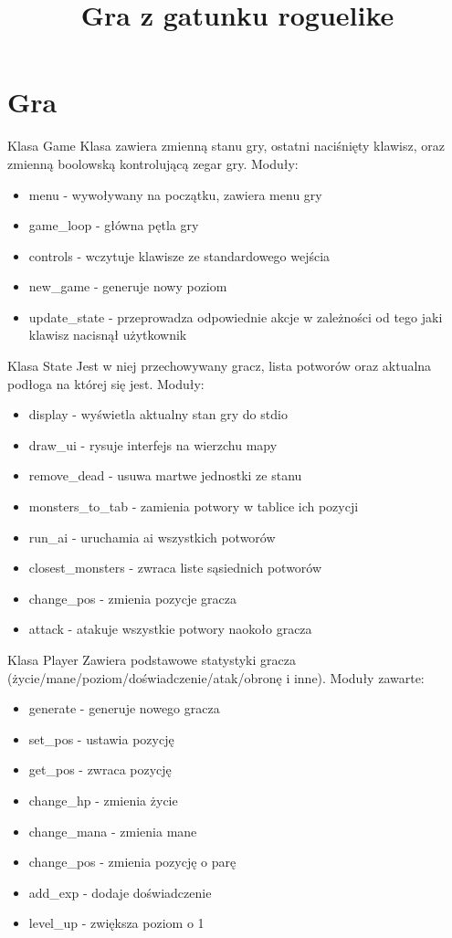 \documentclass{beamer}
\title[Programowanie Obiektowe]{Gra z gatunku roguelike}
\begin{document}
\begin{frame}
  \titlepage
\end{frame}
\section{Gra}
\begin{frame}{Klasa Game}
Klasa zawiera zmienną stanu gry, ostatni naciśnięty klawisz, oraz zmienną boolowską kontrolującą zegar gry. Moduły:
\begin{itemize}
\item menu - wywoływany na początku, zawiera menu gry
\item game\_loop - główna pętla gry
\item controls - wczytuje klawisze ze standardowego wejścia
\item new\_game - generuje nowy poziom
\item update\_state - przeprowadza odpowiednie akcje w zależności od tego jaki klawisz nacisnął użytkownik
\end{itemize}
\end{frame}
\begin{frame}{Klasa State}
Jest w niej przechowywany gracz, lista potworów oraz aktualna podłoga na której się jest. Moduły:
\begin{itemize}
\item display - wyświetla aktualny stan gry do stdio
\item draw\_ui - rysuje interfejs na wierzchu mapy
\item remove\_dead - usuwa martwe jednostki ze stanu
\item monsters\_to\_tab - zamienia potwory w tablice ich pozycji
\item run\_ai - uruchamia ai wszystkich potworów
\item closest\_monsters - zwraca liste sąsiednich potworów
\item change\_pos - zmienia pozycje gracza
\item attack - atakuje wszystkie potwory naokoło gracza
\end{itemize}
\end{frame}
\begin{frame}{Klasa Player}
Zawiera podstawowe statystyki gracza (życie/mane/poziom/doświadczenie/atak/obronę i inne). Moduły zawarte:
\begin{itemize}
\item generate - generuje nowego gracza
\item set\_pos - ustawia pozycję
\item get\_pos - zwraca pozycję
\item change\_hp - zmienia życie
\item change\_mana - zmienia mane
\item change\_pos - zmienia pozycję o parę
\item add\_exp - dodaje doświadczenie
\item level\_up - zwiększa poziom o 1
\end{itemize}
\end{frame}
\end{document}
